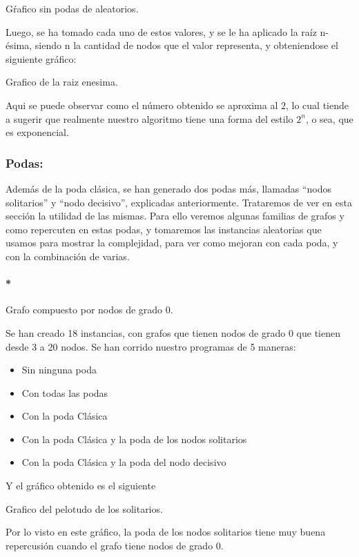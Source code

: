 Gŕafico sin podas de aleatorios.


Luego, se ha tomado cada uno de estos valores, y se le ha aplicado la raíz n-ésima, siendo n la cantidad de nodos que el valor representa, y obteniendose el siguiente gráfico:

Grafico de la raiz enesima.

Aqui se puede observar como el número obtenido se aproxima al $2$, lo cual tiende a sugerir que realmente nuestro algoritmo tiene una forma del estilo $2^n$, o sea, que es exponencial.

\vspace*{0.6cm}

\subsubsection{Podas:}

Además de la poda clásica, se han generado dos podas más, llamadas ``nodos solitarios'' y ``nodo decisivo'', explicadas anteriormente. Trataremos de ver en esta sección la utilidad de las mismas. Para ello veremos algunas familias de grafos y como repercuten en estas podas, y tomaremos las instancias aleatorias que usamos para mostrar la complejidad, para ver como mejoran con cada poda, y con la combinación de varias.

\paragraph{*}
Grafo compuesto por nodos de grado 0.



Se han creado 18 instancias, con grafos que tienen nodos de grado 0 que tienen desde 3 a 20 nodos. Se han corrido nuestro programas de 5 maneras:

\begin{itemize}
	\item Sin ninguna poda
	\item Con todas las podas 
	\item Con la poda Clásica
	\item Con la poda Clásica y la poda de los nodos solitarios
	\item Con la poda Clásica y la poda del nodo decisivo
\end{itemize}

Y el gráfico obtenido es el siguiente

Grafico del pelotudo de los solitarios.

Por lo visto en este gráfico, la poda de los nodos solitarios tiene muy buena repercusión cuando el grafo tiene nodos de grado 0.

